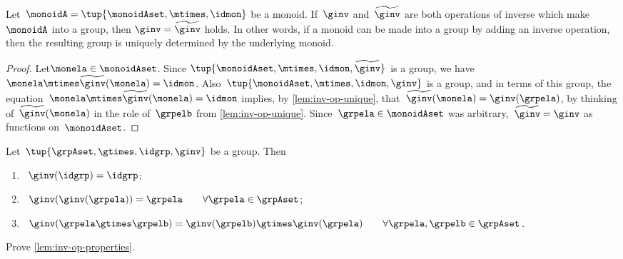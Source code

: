 \begin{corollary}
 \label{cor:inv-op-unique}
Let~$\monoidA = \tup{\monoidAset, \mtimes,  \idmon }$ be a monoid.
 If~$\ginv$ and~$\widetilde \ginv$ are both operations of inverse which make$\monoidA$ into a group, then $\ginv = \widetilde \ginv$ holds.
 In other words, if a monoid can be made into a group by adding an inverse operation, then the resulting group is uniquely determined by the underlying monoid.
\end{corollary}

\begin{proof}
Let$\monela \in \monoidAset$.
Since $\tup{\monoidAset, \mtimes,  \idmon, \widetilde \ginv }$ is a group, we have~$\monela \mtimes  \widetilde \ginv(\monela) = \idmon$.
Also~$\tup{\monoidAset, \mtimes,  \idmon, \ginv }$ is a group, and in terms of this group, the equation~$\monela \mtimes  \widetilde \ginv(\monela) = \idmon$ implies, by \cref{lem:inv-op-unique}, that~$\widetilde \ginv(\monela) = \ginv(\grpela)$, by thinking of~$\widetilde \ginv(\monela)$ in the role of~$\grpelb$ from \cref{lem:inv-op-unique}.
Since~$\grpela \in \monoidAset$ was arbitrary,~$\widetilde \ginv = \ginv$ as functions on~$\monoidAset$.
\end{proof}


\begin{lemma}
  \label{lem:inv-op-properties}
  Let~$\tup{\grpAset, \gtimes, \idgrp, \ginv}$ be a group. Then
  \begin{enumerate}
    \item\label{eq:group-neutral-invariant}~$\ginv(\idgrp) = \idgrp$;
    \item\label{eq:group-inverse-inverse}~$ \ginv(\ginv(\grpela)) = \grpela \qquad \forall \grpela \in \grpAset$;
    \item\label{eq:group-inverse-of-composition}~$\ginv(\grpela \gtimes \grpelb ) = \ginv(\grpelb) \gtimes \ginv(\grpela) \qquad \forall \grpela, \grpelb \in \grpAset$.
  \end{enumerate}
\end{lemma}

\begin{gradedexercise}\label{ex:GroupInverseProperties}
  Prove \cref{lem:inv-op-properties}.
\end{gradedexercise}

